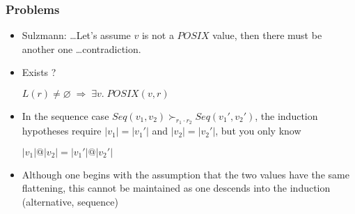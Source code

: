 \documentclass{beamer}
\begin{document}
	
%	
%		
%		
%		
%	
	
	
	\begin{frame}
	\frametitle{Problems}
	\begin{itemize}
	
	\item Sulzmann: \ldots Let's assume $v$ is not a $POSIX$ value, 
	then there must be another one \ldots contradiction.
	
	\item Exists ?
	\begin{center}
	$L(r) \not= \varnothing \;\Rightarrow\; \exists v.\;POSIX(v, r)$
	\end{center}
	
	\item In the sequence case 
	$Seq(v_1,v_2)\succ_{r_1\cdot r_2} Seq(v_1', v_2')$, 
	the induction hypotheses require 
	$|v_1| = |v_1'|$ and $|v_2| = |v_2'|$, but you only know 
	
	\begin{center}
	$|v_1| @ |v_2| = |v_1'| @ |v_2'|$
	\end{center}
	
	\item Although one begins with the assumption that the two 
	values have the same flattening, this cannot be maintained 
	as one descends into the induction (alternative, sequence)
		
	\end{itemize}
	\end{frame}
	
\end{document}
